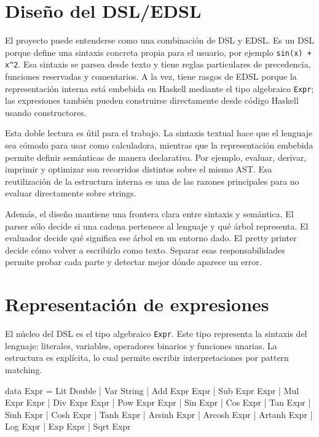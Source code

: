 \documentclass[11pt,a4paper]{article}
\newenvironment{lstlisting}{\verbatim}{\endverbatim}
\begin{document}
\section{Diseño del DSL/EDSL}

El proyecto puede entenderse como una combinación de DSL y EDSL. Es un DSL porque define una sintaxis concreta propia para el usuario, por ejemplo \texttt{sin(x) + x\^{}2}. Esa sintaxis se parsea desde texto y tiene reglas particulares de precedencia, funciones reservadas y comentarios. A la vez, tiene rasgos de EDSL porque la representación interna está embebida en Haskell mediante el tipo algebraico \texttt{Expr}; las expresiones también pueden construirse directamente desde código Haskell usando constructores.

Esta doble lectura es útil para el trabajo. La sintaxis textual hace que el lenguaje sea cómodo para usar como calculadora, mientras que la representación embebida permite definir semánticas de manera declarativa. Por ejemplo, evaluar, derivar, imprimir y optimizar son recorridos distintos sobre el mismo AST. Esa reutilización de la estructura interna es una de las razones principales para no evaluar directamente sobre strings.

Además, el diseño mantiene una frontera clara entre sintaxis y semántica. El parser sólo decide si una cadena pertenece al lenguaje y qué árbol representa. El evaluador decide qué significa ese árbol en un entorno dado. El pretty printer decide cómo volver a escribirlo como texto. Separar esas responsabilidades permite probar cada parte y detectar mejor dónde aparece un error.

\section{Representación de expresiones}

El núcleo del DSL es el tipo algebraico \texttt{Expr}. Este tipo representa la sintaxis del lenguaje: literales, variables, operadores binarios y funciones unarias. La estructura es explícita, lo cual permite escribir interpretaciones por pattern matching.

\begin{lstlisting}
data Expr
  = Lit Double
  | Var String
  | Add Expr Expr
  | Sub Expr Expr
  | Mul Expr Expr
  | Div Expr Expr
  | Pow Expr Expr
  | Sin Expr
  | Cos Expr
  | Tan Expr
  | Sinh Expr
  | Cosh Expr
  | Tanh Expr
  | Arsinh Expr
  | Arcosh Expr
  | Artanh Expr
  | Log Expr
  | Exp Expr
  | Sqrt Expr
\end{lstlisting}
\end{document}
